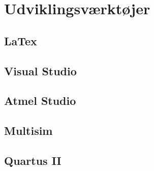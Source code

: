 \chapter{Udviklingsværktøjer}

\section{LaTex}

\section{Visual Studio}

\section{Atmel Studio}

\section{Multisim}

\section{Quartus II}